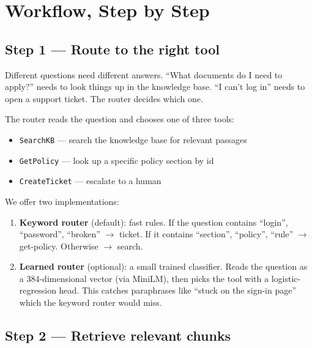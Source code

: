 \documentclass[11pt,a4paper]{article}
\begin{document}
\clearpage
\section{Workflow, Step by Step}
\label{sec:workflow}

\subsection{Step 1 --- Route to the right tool}

\begin{keyidea}
Different questions need different answers. ``What documents do I need to apply?'' needs to look things up in the knowledge base. ``I can't log in'' needs to open a support ticket. The router decides which one.
\end{keyidea}

The router reads the question and chooses one of three tools:

\begin{itemize}[leftmargin=*, itemsep=1pt]
\item \texttt{SearchKB} --- search the knowledge base for relevant passages
\item \texttt{GetPolicy} --- look up a specific policy section by id
\item \texttt{CreateTicket} --- escalate to a human
\end{itemize}

We offer two implementations:

\begin{enumerate}[leftmargin=*, itemsep=2pt]
\item \textbf{Keyword router} (default): fast rules. If the question contains ``login'', ``password'', ``broken'' $\rightarrow$ ticket. If it contains ``section'', ``policy'', ``rule'' $\rightarrow$ get-policy. Otherwise $\rightarrow$ search.
\item \textbf{Learned router} (optional): a small trained classifier. Reads the question as a 384-dimensional vector (via MiniLM), then picks the tool with a logistic-regression head. This catches paraphrases like ``stuck on the sign-in page'' which the keyword router would miss.
\end{enumerate}

\subsection{Step 2 --- Retrieve relevant chunks}
\end{document}
